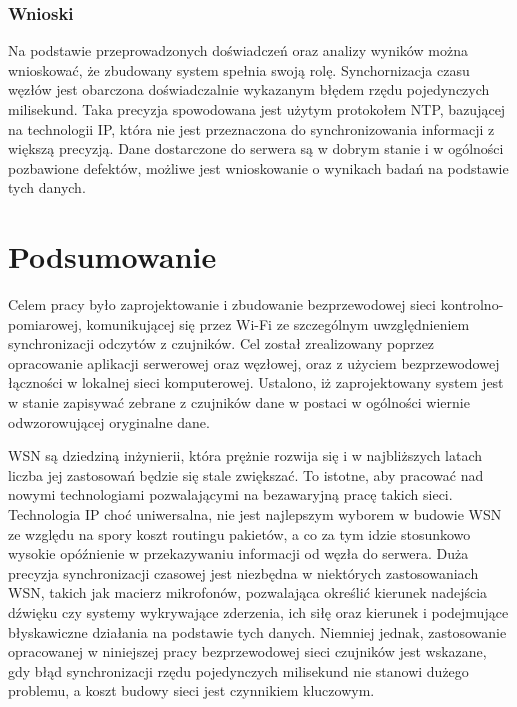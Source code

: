 \documentclass[12pt,oneside,a4paper]{book}
\theoremstyle{break}
\begin{document}
\subsection{Wnioski}
Na podstawie przeprowadzonych doświadczeń oraz analizy
wyników można wnioskować, że zbudowany system
spełnia swoją rolę. Synchornizacja czasu węzłów jest obarczona
doświadczalnie wykazanym błędem rzędu pojedynczych milisekund.
Taka precyzja spowodowana jest użytym protokołem NTP,
bazującej na technologii IP, która 
nie jest przeznaczona
do synchronizowania informacji z większą
precyzją. Dane
dostarczone do serwera są w dobrym stanie i w ogólności 
pozbawione
defektów, możliwe
jest wnioskowanie o wynikach badań na podstawie tych danych.


\chapter{Podsumowanie} 
Celem pracy było zaprojektowanie i zbudowanie bezprzewodowej 
sieci kontrolno-pomiarowej, komunikującej się przez Wi-Fi ze 
szczególnym uwzględnieniem synchronizacji odczytów z czujników.
Cel został zrealizowany poprzez opracowanie aplikacji serwerowej
oraz węzłowej, oraz z użyciem bezprzewodowej łączności w lokalnej
sieci komputerowej. Ustalono, iż zaprojektowany 
system jest w stanie zapisywać
zebrane z czujników dane w postaci w ogólności wiernie odwzorowującej
oryginalne dane.
\par WSN są dziedziną inżynierii, która prężnie rozwija się i 
w najbliższych latach liczba jej zastosowań będzie się stale 
zwiększać. To istotne, aby pracować nad nowymi technologiami
pozwalającymi na bezawaryjną pracę takich sieci. Technologia 
IP choć uniwersalna, nie jest najlepszym wyborem w budowie WSN
ze względu na spory koszt routingu pakietów, a co za tym idzie
stosunkowo wysokie opóźnienie w przekazywaniu informacji od węzła 
do serwera. Duża precyzja synchronizacji czasowej jest niezbędna
w niektórych zastosowaniach WSN, takich jak macierz mikrofonów, 
pozwalająca określić kierunek nadejścia dźwięku czy systemy 
wykrywające zderzenia, ich siłę oraz kierunek i podejmujące
błyskawiczne działania na podstawie tych danych.
Niemniej jednak, zastosowanie opracowanej w niniejszej pracy 
bezprzewodowej sieci czujników jest wskazane, gdy błąd synchronizacji
rzędu pojedynczych milisekund nie stanowi dużego problemu, 
a koszt budowy sieci jest czynnikiem kluczowym.
\end{document}
